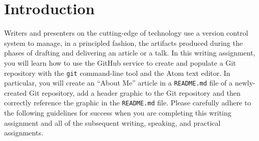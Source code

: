 

\usepackage[compact]{titlesec}




\vspace*{-.2in}
\section*{Introduction}

Writers and presenters on the cutting-edge of technology use a version control system to manage, in a principled
fashion, the artifacts produced during the phases of drafting and delivering an article or a talk. In this writing
assignment, you will learn how to use the GitHub service to create and populate a Git repository with the {\tt git}
command-line tool and the Atom text editor. In particular, you will create an ``About Me'' article in a {\tt README.md}
file of a newly-created Git repository, add a header graphic to the Git repository and then correctly reference the
graphic in the {\tt README.md} file. Please carefully adhere to the following guidelines for success when you are
completing this writing assignment and all of the subsequent writing, speaking, and practical assignments.

